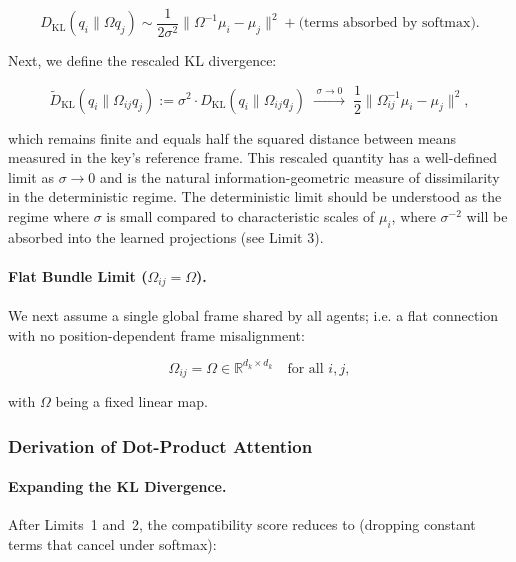 \documentclass[twoside,11pt]{article}
\begin{document}
\begin{equation}
D_{\mathrm{KL}}(q_i \| \Omega q_j) \sim \frac{1}{2\sigma^2}\|\Omega^{-1}\mu_i - \mu_j\|^2 + \text{(terms absorbed by softmax)}.
\end{equation}

Next, we define the rescaled KL divergence:

\begin{equation}
\widetilde{D}_{\mathrm{KL}}(q_i \| \Omega_{ij}q_j) := \sigma^2 \cdot D_{\mathrm{KL}}(q_i \| \Omega_{ij}q_j) \;\xrightarrow{\;\sigma\to 0\;}\; \frac{1}{2}\|\Omega_{ij}^{-1}\mu_i - \mu_j\|^2,
\end{equation}

which remains finite and equals half the squared distance between means measured in the key's reference frame. This rescaled quantity has a well-defined limit as $\sigma \to 0$ and is the natural information-geometric measure of dissimilarity in the deterministic regime. The deterministic limit should be understood as the regime where $\sigma$ is small compared to characteristic scales of $\mu_i$, where $\sigma^{-2}$ will be absorbed into the learned projections (see Limit 3).


\paragraph{Flat Bundle Limit ($\Omega_{ij} = \Omega$).}

We next assume a single global frame shared by all agents; i.e. a flat connection with no position-dependent frame misalignment:

\begin{equation}
\Omega_{ij} = \Omega \in \mathbb{R}^{d_k \times d_k} \quad\text{for all } i,j,
\end{equation}

with $\Omega$ being a fixed linear map.


\subsubsection{Derivation of Dot-Product Attention}

\paragraph{Expanding the KL Divergence.}

After Limits~1 and~2, the compatibility score reduces to (dropping constant terms that cancel under softmax):
\end{document}
